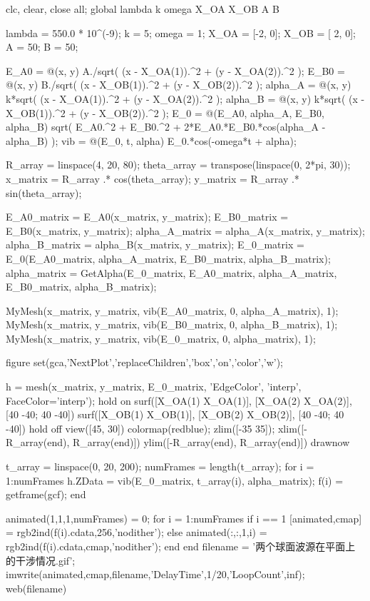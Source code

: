 \documentclass[UTF8]{report}
\theoremstyle{MyLineTheoremStyle} %
\theoremstyle{MyBlockTheoremStyle} %
\theoremstyle{MySubsubsectionStyle} %
\begin{document}
\begin{matlablisting}

clc, clear, close all;
global lambda k omega X_OA X_OB A B

lambda = 550.0 * 10^(-9); %
k = 5;      %
omega = 1;  %
X_OA = [-2, 0];  %
X_OB = [ 2, 0];  %
A = 50; %
B = 50; %

E_A0 = @(x, y) A./sqrt( (x - X_OA(1)).^2 + (y - X_OA(2)).^2 ); %
E_B0 = @(x, y) B./sqrt( (x - X_OB(1)).^2 + (y - X_OB(2)).^2 ); %
alpha_A = @(x, y) k*sqrt( (x - X_OA(1)).^2 + (y - X_OA(2)).^2 );
alpha_B = @(x, y) k*sqrt( (x - X_OB(1)).^2 + (y - X_OB(2)).^2 );
E_0 = @(E_A0, alpha_A, E_B0, alpha_B) sqrt( E_A0.^2 + E_B0.^2 + 2*E_A0.*E_B0.*cos(alpha_A - alpha_B) );
vib = @(E_0, t, alpha) E_0.*cos(-omega*t + alpha); %

R_array = linspace(4, 20, 80);
theta_array = transpose(linspace(0, 2*pi, 30));
x_matrix = R_array .* cos(theta_array);
y_matrix = R_array .* sin(theta_array);

E_A0_matrix = E_A0(x_matrix, y_matrix);
E_B0_matrix = E_B0(x_matrix, y_matrix);
alpha_A_matrix = alpha_A(x_matrix, y_matrix);
alpha_B_matrix = alpha_B(x_matrix, y_matrix);
E_0_matrix = E_0(E_A0_matrix, alpha_A_matrix, E_B0_matrix, alpha_B_matrix);
alpha_matrix = GetAlpha(E_0_matrix, E_A0_matrix, alpha_A_matrix, E_B0_matrix, alpha_B_matrix);

MyMesh(x_matrix, y_matrix, vib(E_A0_matrix, 0, alpha_A_matrix), 1);
MyMesh(x_matrix, y_matrix, vib(E_B0_matrix, 0, alpha_B_matrix), 1);
MyMesh(x_matrix, y_matrix, vib(E_0_matrix, 0, alpha_matrix), 1);


figure 
set(gca,'NextPlot','replaceChildren','box','on','color','w');
 
    h = mesh(x_matrix, y_matrix, E_0_matrix, 'EdgeColor', 'interp', FaceColor='interp');
    hold on
    surf([X_OA(1) X_OA(1)], [X_OA(2) X_OA(2)], [40 -40; 40 -40])
    surf([X_OB(1) X_OB(1)], [X_OB(2) X_OB(2)], [40 -40; 40 -40])
    hold off
    view([45, 30])
    colormap(redblue);
    zlim([-35 35]);
    xlim([-R_array(end), R_array(end)])
    ylim([-R_array(end), R_array(end)])
    drawnow

t_array = linspace(0, 20, 200);
numFrames = length(t_array);
for i = 1:numFrames
    h.ZData = vib(E_0_matrix, t_array(i), alpha_matrix);
    f(i) = getframe(gcf);
end
 
animated(1,1,1,numFrames) = 0;
for i = 1:numFrames
    if i == 1
        [animated,cmap] = rgb2ind(f(i).cdata,256,'nodither');
    else
        animated(:,:,1,i) = rgb2ind(f(i).cdata,cmap,'nodither');
    end
end
filename = '两个球面波源在平面上的干涉情况.gif';
imwrite(animated,cmap,filename,'DelayTime',1/20,'LoopCount',inf);
web(filename)
\end{matlablisting}
\end{document}
